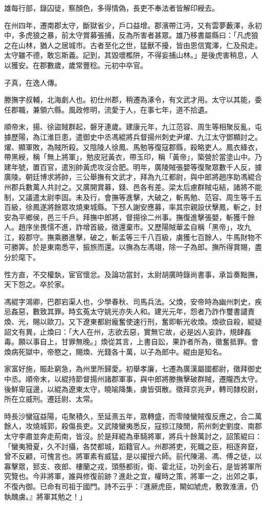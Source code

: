 \begin{pinyinscope}
雄每行部，錄囚徒，察顏色，多得情偽，長吏不奉法者皆解印綬去。

在州四年，遷南郡太守，斷獄省少，戶口益增。郡濱帶江沔，又有雲夢藪澤，永初中，多虎狼之暴，前太守賞募張捕，反為所害者甚眾。雄乃移書屬縣曰：「凡虎狼之在山林，猶人之居城市。古者至化之世，猛獸不擾，皆由恩信寬澤，仁及飛走。太守雖不德，敢忘斯義。記到，其毀壞檻阱，不得妄捕山林。」是後虎害稍息，人以獲安。在郡數歲，歲常豐稔。元初中卒官。

子真，在逸人傳。

滕撫字叔輔，北海劇人也。初仕州郡，稍遷為涿令，有文武才用。太守以其能，委任郡職，兼領六縣。風政修明，流愛于人，在事七年，道不拾遺。

順帝末，揚、徐盜賊群起，磐牙連歲。建康元年，九江范容、周生等相聚反亂，屯據歷陽，為江淮巨患，遣御史中丞馮緄將兵督揚州刺史尹燿、九江太守鄧顯討之。燿、顯軍敗，為賊所殺。又陰陵人徐鳳、馬勉等復寇郡縣，殺略吏人。鳳衣絳衣，帶黑綬，稱「無上將軍」，勉皮冠黃衣，帶玉印，稱「黃帝」，築營於當塗山中。乃建年號，置百官，遣別帥黃虎攻沒合肥。明年，廣陵賊張嬰等復聚眾數千人反，據廣陵。朝廷博求將帥，三公舉撫有文武才，拜為九江都尉，與中郎將趙序助馮緄合州郡兵數萬人共討之。又廣開賞募，錢、邑各有差。梁太后慮群賊屯結，諸將不能制，又議遣太尉李固。未及行，會撫等進擊，大破之，斬馬勉、范容、周生等千五百級，徐鳳遂將餘眾攻燒東城縣。下邳人謝安應募，率其宗親設伏擊鳳，斬之，封安為平鄉侯，邑三千戶。拜撫中郎將，督揚徐二州事。撫復進擊張嬰，斬獲千餘人。趙序坐畏懦不進，詐增首級，徵還棄市。又歷陽賊華孟自稱「黑帝」，攻九江，殺郡守。撫乘勝進擊，破之，斬孟等三千八百級，虜獲七百餘人，牛馬財物不可勝筭。於是東南悉平，振旅而還。以撫為左馮翊，除一子為郎。撫所得賞賜，盡分於麾下。

性方直，不交權埶，宦官懷忿。及論功當封，太尉胡廣時錄尚書事，承旨奏黜撫，天下怨之。卒於家。

馮緄字鴻卿，巴郡宕渠人也，少學春秋、司馬兵法。父煥，安帝時為幽州刺史，疾忌姦惡，數致其罪。時玄菟太守姚光亦失人和。建光元年，怨者乃詐作璽書譴責煥、光，賜以歐刀。又下遼東都尉龐奮使速行刑，奮即斬光收煥。煥欲自殺，緄疑詔文有異，止煥曰：「大人在州，志欲去惡，實無它故，必是凶人妄詐，規肆姦毒。願以事自上，甘罪無晚。」煥從其言，上書自訟，果詐者所為，徵奮抵罪。會煥病死獄中，帝愍之，賜煥、光錢各十萬，以子為郎中。緄由是知名。

家富好施，賑赴窮急，為州里所歸愛。初舉孝廉，七遷為廣漢屬國都尉，徵拜御史中丞。順帝末，以緄持節督揚州諸郡軍事，與中郎將滕撫擊破群賊，遷隴西太守。後鮮卑寇邊，以緄為遼東太守，曉喻降集，虜皆弭散。徵拜京兆尹，轉司隸校尉，所在立威刑。遷廷尉、太常。

時長沙蠻寇益陽，屯聚積久，至延熹五年，眾轉盛，而零陵蠻賊復反應之，合二萬餘人，攻燒城郭，殺傷長吏。又武陵蠻夷悉反，寇掠江陵閒，荊州刺史劉度、南郡太守李肅並奔走荊南，皆沒。於是拜緄為車騎將軍，將兵十餘萬討之，詔策緄曰：「蠻夷猾夏，久不討攝，各焚都城，蹈籍官人。州郡將吏，死職之臣，相逐奔竄，曾不反顧，可愧言也。將軍素有威猛，是以擢授六師。前代陳湯、馮、傅之徒，以寡擊眾，郅支、夜郎、樓蘭之戎，頭懸都街，衛、霍北征，功列金石，是皆將軍所究覽也。今非將軍，誰與修復前跡？進赴之宜，權時之策，將軍一之，出郊之事，不復內御。已命有司祖于國門。詩不云乎：『進厥虎臣，闞如虓虎，敷敦淮濆，仍執醜虜。』將軍其勉之！」


\end{pinyinscope}
